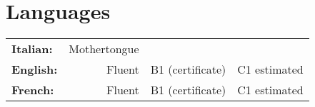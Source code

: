 \section{\sc Languages}
\begin{tabular}{lr|ll}
	\textbf{Italian:} & Mothertongue & &\\
	\textbf{English:} & Fluent & B1 (certificate) & C1 estimated \\
	\textbf{French:} & Fluent & B1 (certificate) & C1 estimated \\
\end{tabular}